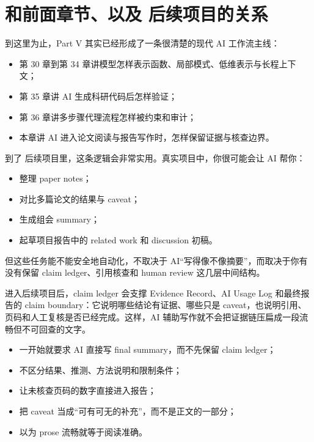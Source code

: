\section{和前面章节、以及 后续项目的关系}

到这里为止，Part V 其实已经形成了一条很清楚的现代 AI 工作流主线：

\begin{itemize}
    \item 第 30 章到第 34 章讲模型怎样表示函数、局部模式、低维表示与长程上下文；
    \item 第 35 章讲 AI 生成科研代码后怎样验证；
    \item 第 36 章讲多步骤代理流程怎样被约束和审计；
    \item 本章讲 AI 进入论文阅读与报告写作时，怎样保留证据与核查边界。
\end{itemize}

到了 后续项目里，这条逻辑会非常实用。真实项目中，你很可能会让 AI 帮你：

\begin{itemize}
    \item 整理 paper notes；
    \item 对比多篇论文的结果与 caveat；
    \item 生成组会 summary；
    \item 起草项目报告中的 related work 和 discussion 初稿。
\end{itemize}

但这些任务能不能安全地自动化，不取决于 AI“写得像不像摘要”，而取决于你有没有保留 claim ledger、引用核查和 human review 这几层中间结构。

进入后续项目后，claim ledger 会支撑 Evidence Record、AI Usage Log 和最终报告的 claim boundary：它说明哪些结论有证据、哪些只是 caveat，也说明引用、页码和人工复核是否已经完成。这样，AI 辅助写作就不会把证据链压扁成一段流畅但不可回查的文字。

\begin{warnbox}[AI 辅助文献阅读中的常见误区]
\begin{itemize}
    \item 一开始就要求 AI 直接写 final summary，而不先保留 claim ledger；
    \item 不区分结果、推测、方法说明和限制条件；
    \item 让未核查页码的数字直接进入报告；
    \item 把 caveat 当成“可有可无的补充”，而不是正文的一部分；
    \item 以为 prose 流畅就等于阅读准确。
\end{itemize}
\end{warnbox}

